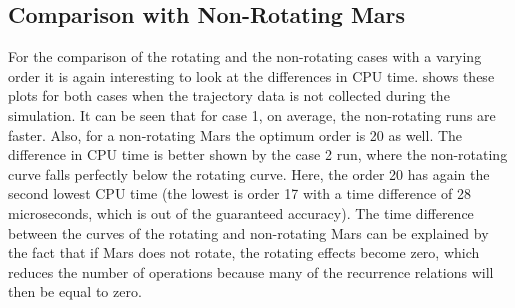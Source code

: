 \subsection{Comparison with Non-Rotating Mars}
\label{subsec:orderCompNotRot}
For the comparison of the rotating and the non-rotating cases with a varying order it is again interesting to look at the differences in CPU time.  shows these plots for both cases when the trajectory data is not collected during the simulation. It can be seen that for case 1, on average, the non-rotating runs are faster. Also, for a non-rotating Mars the optimum order is 20 as well. The difference in CPU time is better shown by the case 2 run, where the non-rotating curve falls perfectly below the rotating curve. Here, the order 20 has again the second lowest CPU time (the lowest is order 17 with a time difference of 28 microseconds, which is out of the guaranteed accuracy). The time difference between the curves of the rotating and non-rotating Mars can be explained by the fact that if Mars does not rotate, the rotating effects become zero, which reduces the number of operations because many of the recurrence relations will then be equal to zero.
%
%
%
%
%


